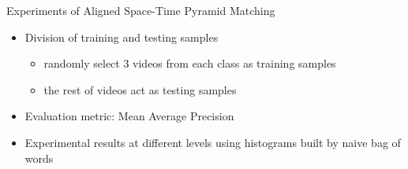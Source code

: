\begin{frame}{Experiments of Aligned Space-Time Pyramid Matching}
	\begin{itemize}
			\item Division of training and testing samples
			\begin{itemize}
				\item randomly select 3 videos from each class as training samples
				\item the rest of videos act as testing samples
			\end{itemize}

			\item Evaluation metric: Mean Average Precision

			\item Experimental results at different levels using histograms built by naive bag of words

				\begin{table}[!ht]
				\begin{center}
				\end{center}
				\caption{Means and standard deviations (percent) of MAPs at different levels}
				\end{table}
	\end{itemize}
\end{frame}

